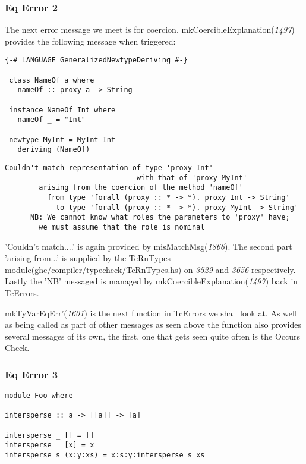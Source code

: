 \documentclass[a4paper]{article}
\begin{document}
\subsubsection{Eq Error 2}

The next error message we meet is for coercion. mkCoercibleExplanation(\textit{1497}) provides the following message when triggered: 

\begin{lstlisting}[label={lst: T8.0}, numbers=none, caption={Example Program \cite{ex8}}]
{-# LANGUAGE GeneralizedNewtypeDeriving #-}

 class NameOf a where
   nameOf :: proxy a -> String

 instance NameOf Int where
   nameOf _ = "Int"

 newtype MyInt = MyInt Int
   deriving (NameOf) 
\end{lstlisting}

\begin{lstlisting}[label={lst: T8.0.2}, numbers=none, caption={Error}]
Couldn't match representation of type 'proxy Int'
                               with that of 'proxy MyInt'
        arising from the coercion of the method 'nameOf'
          from type 'forall (proxy :: * -> *). proxy Int -> String'
            to type 'forall (proxy :: * -> *). proxy MyInt -> String'
      NB: We cannot know what roles the parameters to 'proxy' have;
        we must assume that the role is nominal
\end{lstlisting}

'Couldn't match....' is again provided by misMatchMsg(\textit{1866}). The second part 'arising from...' is supplied by the TcRnTypes module(ghc/compiler/typecheck/TcRnTypes.hs) on \textit{3529} and \textit{3656} respectively. Lastly the 'NB' messaged is managed by mkCoercibleExplanation(\textit{1497}) back in TcErrors.

mkTyVarEqErr'(\textit{1601}) is the next function in TcErrors we shall look at. As well as being called as part of other messages as seen above the function also provides several messages of its own, the first, one that gets seen quite often is the Occurs Check.

\subsubsection{Eq Error 3}

\begin{lstlisting}[label={lst: T9.0}, numbers=none, caption={Example Program \cite{ex9}}]
module Foo where

intersperse :: a -> [[a]] -> [a]

intersperse _ [] = []
intersperse _ [x] = x
intersperse s (x:y:xs) = x:s:y:intersperse s xs
\end{lstlisting}
\end{document}
